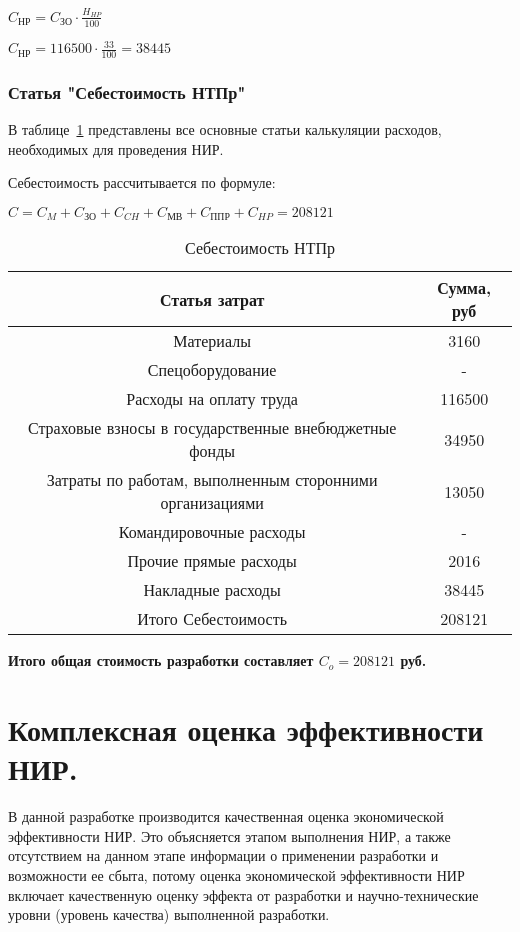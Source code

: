 \begin{center}
$C_{\text{НР}} = C_{\text{ЗО}} \cdot \frac{H_{HP}}{100}$

$C_{\text{НР}} = 116500 \cdot \frac{33}{100} = 38445$
\end{center}

\subsubsection*{Статья "Себестоимость НТПр"}
В таблице~\ref{table5} представлены все основные статьи калькуляции расходов, необходимых для проведения НИР.

Себестоимость рассчитывается по формуле:

$C = C_{M} + C_{\text{ЗО}} + C_{CH} + C_{\text{МВ}} + C_{\text{ППР}} + C_{HP} = 208121$

\begin{table}[h!]
\caption{Себестоимость НТПр}\label{table5}
\begin{tabular}{|c|c|}
  \hline
  Статья затрат & Сумма, руб \\ \hline
  Материалы & 3160 \\ \hline
  Спецоборудование &  - \\ \hline
  Расходы на оплату труда & 116500\\ \hline
  Страховые взносы в государственные внебюджетные фонды & 34950\\ \hline
  Затраты по работам, выполненным сторонними организациями & 13050\\ \hline
  Командировочные расходы & - \\ \hline
  Прочие прямые расходы & 2016\\ \hline
  Накладные расходы & 38445\\ \hline
  Итого Себестоимость & 208121\\ \hline
\end{tabular}
\end{table}

\textbf{Итого общая стоимость разработки составляет $C_{o} = 208121$ руб.}

\section{Комплексная оценка эффективности НИР.}

В данной разработке производится качественная оценка экономической эффективности НИР. Это объясняется этапом выполнения НИР, а также отсутствием на данном этапе информации о применении разработки и возможности ее сбыта, потому оценка экономической эффективности НИР включает качественную оценку эффекта от разработки и научно-технические уровни (уровень качества) выполненной разработки.

